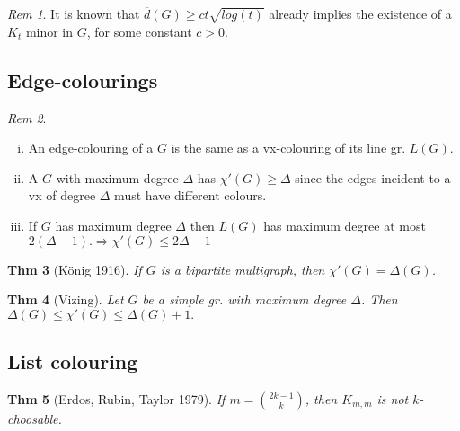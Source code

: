 \documentclass[11pt, fleqn, a4paper, landscape]{article}
\theoremstyle{plain} %
\newtheorem{thm}{Thm}
\theoremstyle{remark} %
\newtheorem{rem}[thm]{Rem}
\theoremstyle{definition} %
\newtheorem{defi}[thm]{Def}
\begin{document}
\begin{multicols}{5}
\begin{rem}
It is known that $\overline{d}(G) \ge ct\sqrt{log(t)}$ already implies the existence of a $K_t$ minor in $G$, for some constant $c > 0$.
\end{rem}
\subsection{Edge-colourings}
\addtocounter{thm}{1}
\begin{rem}
\begin{enumerate}[(i)]
\item An edge-colouring of a $G$ is the same as a vx-colouring of its line gr. $L(G)$.
\item A $G$ with maximum degree $\Delta$ has $\chi'(G) \ge \Delta$ since the edges incident to a vx of degree $\Delta$ must have different colours.
\item If $G$ has maximum degree $\Delta$ then $L(G)$ has maximum degree at most $2(\Delta-1).\Rightarrow \chi'(G) \le 2\Delta - 1$ 
\end{enumerate}
\end{rem}

\begin{thm}[König 1916]
If $G$ is a bipartite multigraph, then $\chi'(G) = \Delta(G)$.
\end{thm}

\begin{thm}[Vizing]
Let $G$ be a simple gr. with maximum degree $\Delta$. Then $\Delta(G)\le \chi'(G) \le \Delta(G) + 1.$
\end{thm}
\addtocounter{thm}{1}

\subsection{List colouring}

\addtocounter{thm}{1}
\begin{thm}[Erdos, Rubin, Taylor 1979]
If $m = \binom{2k-1}{k}$, then $K_{m,m}$ is not $k$-choosable.
\end{thm}


\end{multicols}
\end{document}
